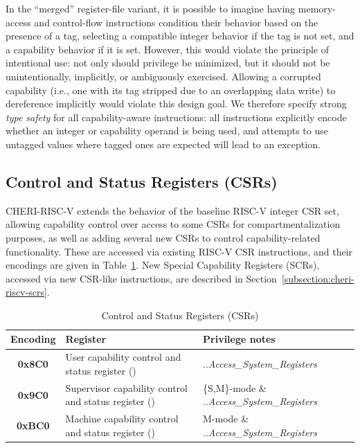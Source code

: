 In the ``merged'' register-file variant,
it is possible to imagine having memory-access and
control-flow instructions condition their behavior based on the presence of a
tag, selecting a compatible integer behavior if the tag is not set, and a
capability behavior if it is set.
However, this would violate the principle of intentional use: not only should
privilege be minimized, but it should not be unintentionally, implicitly, or
ambiguously exercised.
Allowing a corrupted capability (i.e., one with its tag stripped due to an
overlapping data write) to dereference \DDC{} implicitly would violate this
design goal.
We therefore specify strong \textit{type safety} for all capability-aware
instructions: all instructions explicitly encode whether an integer or
capability operand is being used, and attempts to use untagged values where
tagged ones are expected will lead to an exception.

\subsection{Control and Status Registers (CSRs)}
\label{subsection:cheri-riscv-csrs}

CHERI-RISC-V extends the behavior of the baseline RISC-V integer CSR set,
allowing capability control over access to some CSRs for compartmentalization
purposes, as well as adding several new CSRs to control capability-related
functionality.
These are accessed via existing RISC-V CSR instructions, and their encodings
are given in Table~\ref{tab:risc-v-control-and-status-registers}.
New Special Capability Registers (SCRs), accessed via new CSR-like
instructions, are described in Section~\ref{subsection:cheri-riscv-scrs}.

\begin{table}[h]
\centering
\begin{tabular}{c>{\raggedright\arraybackslash}p{2.7in}>{\raggedright\arraybackslash}p{2.5in}}
\toprule
\textbf{Encoding} & \textbf{Register} & Privilege notes \\
\midrule
\textbf{0x8C0} & User capability control and status register (\uccsr{}) & \PCC{}.\cperms{}.\emph{Access\_System\_Registers} \\
\textbf{0x9C0} & Supervisor capability control and status register (\sccsr{}) & \{S,M\}-mode \& \PCC{}.\cperms{}.\emph{Access\_System\_Registers} \\
\textbf{0xBC0} & Machine capability control and status register (\mccsr{}) & M-mode \& \PCC{}.\cperms{}.\emph{Access\_System\_Registers} \\
\bottomrule
\end{tabular}
\caption{Control and Status Registers (CSRs)}
\label{tab:risc-v-control-and-status-registers}
\end{table}

